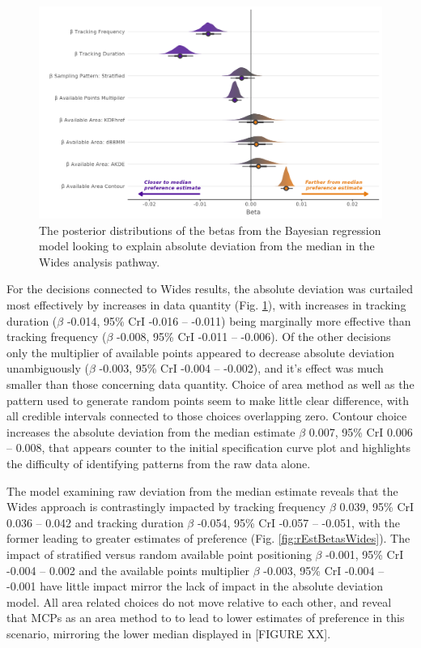\documentclass[10pt,a4paper]{article}
\begin{document}
\begin{figure}
\includegraphics[width=1\linewidth]{../figures/wides_dEstWides_effectsPlot} \caption{The posterior distributions of the betas from the Bayesian regression model looking to explain absolute deviation from the median in the Wides analysis pathway.}\label{fig:dEstBetasWides}
\end{figure}

For the decisions connected to Wides results, the absolute deviation was curtailed most effectively by increases in data quantity (Fig. \ref{fig:dEstBetasWides}), with increases in tracking duration (\(\beta\) -0.014, 95\% CrI -0.016 -- -0.011) being marginally more effective than tracking frequency (\(\beta\) -0.008, 95\% CrI -0.011 -- -0.006).
Of the other decisions only the multiplier of available points appeared to decrease absolute deviation unambiguously (\(\beta\) -0.003, 95\% CrI -0.004 -- -0.002), and it's effect was much smaller than those concerning data quantity.
Choice of area method as well as the pattern used to generate random points seem to make little clear difference, with all credible intervals connected to those choices overlapping zero.
Contour choice increases the absolute deviation from the median estimate \(\beta\) 0.007, 95\% CrI 0.006 -- 0.008, that appears counter to the initial specification curve plot and highlights the difficulty of identifying patterns from the raw data alone.

The model examining raw deviation from the median estimate reveals that the Wides approach is contrastingly impacted by tracking frequency \(\beta\) 0.039, 95\% CrI 0.036 -- 0.042 and tracking duration \(\beta\) -0.054, 95\% CrI -0.057 -- -0.051, with the former leading to greater estimates of preference (Fig. \ref{fig:rEstBetasWides}).
The impact of stratified versus random available point positioning \(\beta\) -0.001, 95\% CrI -0.004 -- 0.002 and the available points multiplier \(\beta\) -0.003, 95\% CrI -0.004 -- -0.001 have little impact mirror the lack of impact in the absolute deviation model.
All area related choices do not move relative to each other, and reveal that MCPs as an area method to to lead to lower estimates of preference in this scenario, mirroring the lower median displayed in {[}FIGURE XX{]}.
\end{document}

